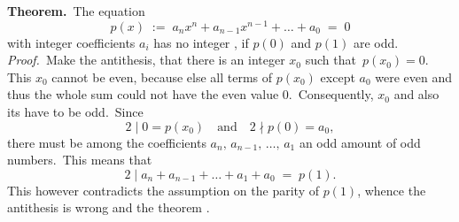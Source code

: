 \documentclass[12pt]{article}
\theoremstyle{definition}
\begin{document}
\textbf{Theorem.}\, The equation
$$p(x) \;:=\; a_nx^n+a_{n-1}x^{n-1}+\ldots+a_0 \;=\; 0$$
with integer coefficients $a_i$ has no integer , if $p(0)$ and $p(1)$ are odd.\\

\emph{Proof.}\, Make the antithesis, that there is an integer $x_0$ such that\, $p(x_0) = 0$.\, This $x_0$ cannot be even, because else all terms of $p(x_0)$ except $a_0$ were even and thus the whole sum could not have the even value 0.\, Consequently, $x_0$ and also its  have to be odd.\, Since 
$$2 \mid 0 = p(x_0) \quad \textrm{and} \quad 2 \nmid p(0) = a_0,$$
there must be among the coefficients $a_n,\,a_{n-1},\,\ldots,\,a_1$ an odd amount of odd numbers.\, This means that
$$2 \mid a_n\!+\!a_{n-1}\!+\!\ldots\!+\!a_1\!+\!a_0 \;=\; p(1).$$
This however contradicts the assumption on the parity of $p(1)$, whence the antithesis is wrong and the theorem .
\end{document}
